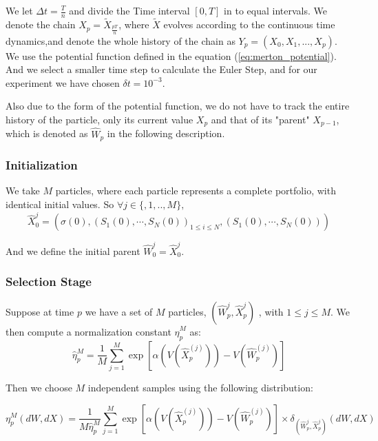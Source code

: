We let $\Delta t = \frac{T}{n}$ and divide the Time interval $[0,T]$ in to equal 
intervals. We denote the chain $X_p = \tilde{X}_{\frac{pT}{n}}$, where $\tilde{X}$ 
evolves according to the continuous time dynamics,and denote the whole history of 
the chain as $Y_{p} =(X_{0},X_{1},...,X_{p})$. We use the potential function 
defined in the equation (\ref{eq:merton_potential}). And we select a smaller 
time step to calculate the Euler Step, and for our experiment we have chosen 
$\delta t = 10^{-3}$.

Also due to the form of the potential function, we do not have to track the 
entire history of the particle, only its current value $X_p$ and that of its 
"parent" $X_{p-1}$, which is denoted as $\hat{W}_p$ in the following description.

\subsubsection{Initialization}
We take $M$ particles, where each particle represents a complete portfolio, 
with identical initial values. So $\forall j \in \{,1,..,M\},$
\begin{equation}
	\hat{X}_0^{j} = \left( \sigma(0), \left( S_1(0), \cdots, S_N(0) \right)_{1 \leq i \leq N} , 
	\left( S_1(0), \cdots, S_N(0) \right) \right)
\end{equation}

And we define the initial parent $\hat{W}_0^{j}=\hat{X}_0^{j}$.

\subsubsection{Selection Stage}
Suppose at time $p$ we have a set of $M$ particles, $(\hat{W}_p^{j},\hat{X}_p^{j})$
, with $1 \leq j \leq M$. We then compute a normalization constant $\hat{\eta}_{p}^{M}$ as:
\begin{equation}
	\hat{\eta}_{p}^{M} = \frac{1}{M} \sum_{j=1}^{M} \exp \left[ \alpha \left( 
	V(\hat{X}_{p}^{(j)}) \right) - V(\hat{W}^{(j)}_{p}) \right]
\end{equation}

Then we choose $M$ independent samples using the following distribution:

\begin{equation}
	\eta_{p}^{M} (dW,dX) = \frac{1}{M \hat{\eta}_{p}^{M}} \sum_{j=1}^{M} 
	\exp \left[ \alpha \left( V(\hat{X}_{p}^{(j)}) \right) - V(\hat{W}^{(j)}_{p}) 
	\right] \times \delta_{(\hat{W}_p^{j},\hat{X}_p^{j})} (dW,dX)
\end{equation}

